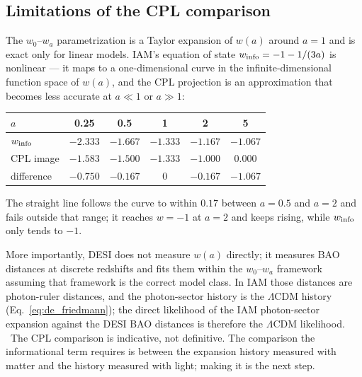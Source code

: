 \subsection{Limitations of the CPL comparison}\label{sec:wz_cpllimits}
The $w_0$--$w_a$ parametrization is a Taylor expansion of $w(a)$ around $a=1$ and is exact only for linear models. IAM's equation of state
$w_{\rm info}=-1-1/(3a)$ is nonlinear --- it maps to a one-dimensional curve in the infinite-dimensional function space of $w(a)$, and the CPL
projection is an approximation that becomes less accurate at $a\ll1$ or $a\gg1$: \calc
\begin{center}\small\begin{tabular}{lccccc}\toprule
$a$ & 0.25 & 0.5 & 1 & 2 & 5\\\midrule
$w_{\rm info}$ & $-2.333$ & $-1.667$ & $-1.333$ & $-1.167$ & $-1.067$\\
CPL image & $-1.583$ & $-1.500$ & $-1.333$ & $-1.000$ & $0.000$\\
difference & $-0.750$ & $-0.167$ & $0$ & $-0.167$ & $-1.067$\\\bottomrule
\end{tabular}\end{center}
The straight line follows the curve to within $0.17$ between $a=0.5$ and $a=2$ and fails outside that range; it reaches $w=-1$ at $a=2$ and keeps
rising, while $w_{\rm info}$ only tends to $-1$.

More importantly, DESI does not measure $w(a)$ directly; it measures BAO distances at discrete redshifts and fits them within the $w_0$--$w_a$
framework assuming that framework is the correct model class. In IAM those distances are photon-ruler distances, and the photon-sector history is
the $\Lambda$CDM history (Eq.~\eqref{eq:de_friedmann}); the direct likelihood of the IAM photon-sector expansion against the DESI BAO distances is
therefore the $\Lambda$CDM likelihood. \derived\ The CPL comparison is indicative, not definitive. The comparison the informational term requires
is between the expansion history measured with matter and the history measured with light; making it is the next step. \openprob

